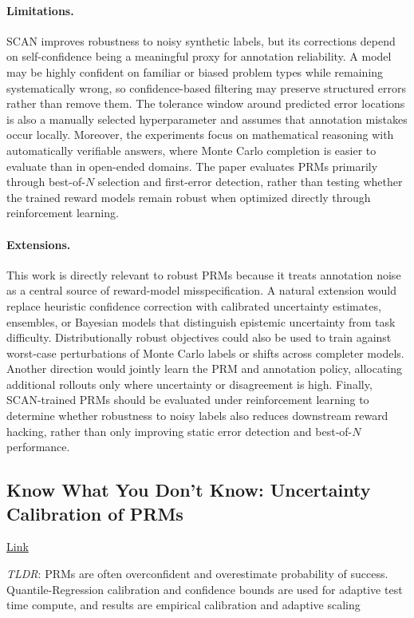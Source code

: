 \documentclass[11pt]{article}
\begin{document}
\paragraph{Limitations.}
SCAN improves robustness to noisy synthetic labels, but its corrections depend on self-confidence being a meaningful proxy for annotation reliability. A model may be highly confident on familiar or biased problem types while remaining systematically wrong, so confidence-based filtering may preserve structured errors rather than remove them. The tolerance window around predicted error locations is also a manually selected hyperparameter and assumes that annotation mistakes occur locally. Moreover, the experiments focus on mathematical reasoning with automatically verifiable answers, where Monte Carlo completion is easier to evaluate than in open-ended domains. The paper evaluates PRMs primarily through best-of-$N$ selection and first-error detection, rather than testing whether the trained reward models remain robust when optimized directly through reinforcement learning.

\paragraph{Extensions.}
This work is directly relevant to robust PRMs because it treats annotation noise as a central source of reward-model misspecification. A natural extension would replace heuristic confidence correction with calibrated uncertainty estimates, ensembles, or Bayesian models that distinguish epistemic uncertainty from task difficulty. Distributionally robust objectives could also be used to train against worst-case perturbations of Monte Carlo labels or shifts across completer models. Another direction would jointly learn the PRM and annotation policy, allocating additional rollouts only where uncertainty or disagreement is high. Finally, SCAN-trained PRMs should be evaluated under reinforcement learning to determine whether robustness to noisy labels also reduces downstream reward hacking, rather than only improving static error detection and best-of-$N$ performance.

\subsection{Know What You Don't Know: Uncertainty Calibration of PRMs}

\href{https://arxiv.org/abs/2506.09338}{Link}

\emph{TLDR}: PRMs are often overconfident and overestimate probability of success. Quantile-Regression calibration and confidence bounds are used for adaptive test time compute, and results are empirical calibration and adaptive scaling
\end{document}
